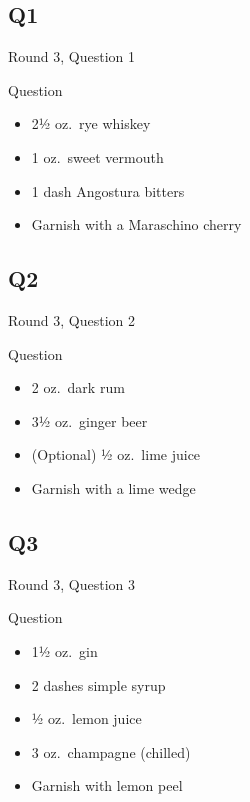 \documentclass[11pt]{beamer}
\begin{document}
\subsection*{Q1}
\begin{frame}[t]{Round 3, Question 1}
\begin{block}{Question}
\begin{itemize}
\item 2½ oz.\ rye whiskey
\item 1 oz.\ sweet vermouth
\item 1 dash Angostura bitters
\item Garnish with a Maraschino cherry
\end{itemize}
\end{block}
\end{frame}
\subsection*{Q2}
\begin{frame}[t]{Round 3, Question 2}
\begin{block}{Question}
\begin{itemize}
\item 2 oz.\ dark rum
\item 3½ oz.\ ginger beer
\item (Optional) ½ oz.\ lime juice
\item Garnish with a lime wedge
\end{itemize}
\end{block}
\end{frame}
\subsection*{Q3}
\begin{frame}[t]{Round 3, Question 3}
\begin{block}{Question}
\begin{itemize}
\item 1½ oz.\ gin
\item 2 dashes simple syrup
\item ½ oz.\ lemon juice
\item 3 oz.\ champagne (chilled)
\item Garnish with lemon peel
\end{itemize}
\end{block}
\end{frame}
\end{document}
